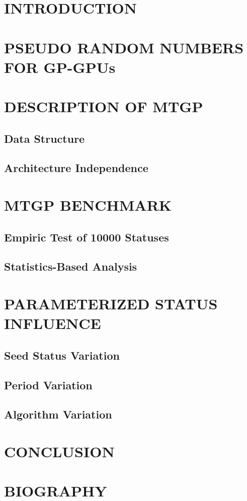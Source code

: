 \documentclass[twoside]{article}
\begin{document}
\makeRR   %

\section{INTRODUCTION}


\section{PSEUDO RANDOM NUMBERS FOR GP-GPUs}


\section{DESCRIPTION OF MTGP}
	\subsection{Data Structure}
	
	
	\subsection{Architecture Independence}
	

\section{MTGP BENCHMARK}
	\subsection{Empiric Test of 10000 Statuses}
	
	
	\subsection{Statistics-Based Analysis}
	

\section{PARAMETERIZED STATUS INFLUENCE}
	\subsection{Seed Status Variation}
	

	\subsection{Period Variation}
	

	\subsection{Algorithm Variation}
	

\section{CONCLUSION}





\section{BIOGRAPHY}

\end{document}
